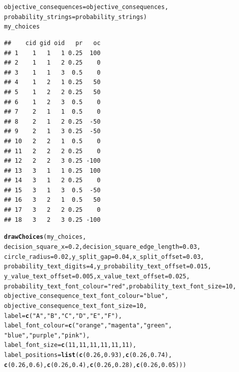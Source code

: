 \documentclass{article}\usepackage[]{graphicx}\usepackage[]{color}
\makeatletter
\newcommand{\hlnum}[1]{\textcolor[rgb]{0.686,0.059,0.569}{#1}}%
\newcommand{\hlstr}[1]{\textcolor[rgb]{0.192,0.494,0.8}{#1}}%
\newcommand{\hlstd}[1]{\textcolor[rgb]{0.345,0.345,0.345}{#1}}%
\newcommand{\hlkwc}[1]{\textcolor[rgb]{0.333,0.667,0.333}{#1}}%
\newcommand{\hlkwd}[1]{\textcolor[rgb]{0.737,0.353,0.396}{\textbf{#1}}}%
\newenvironment{kframe}{%
 \def\at@end@of@kframe{}%
 \ifinner\ifhmode%
  \def\at@end@of@kframe{\end{minipage}}%
  \begin{minipage}{\columnwidth}%
 \fi\fi%
 \def\FrameCommand##1{\hskip\@totalleftmargin \hskip-\fboxsep
 \colorbox{shadecolor}{##1}\hskip-\fboxsep
     \hskip-\linewidth \hskip-\@totalleftmargin \hskip\columnwidth}%
 \MakeFramed {\advance\hsize-\width
   \@totalleftmargin\z@ \linewidth\hsize
   \@setminipage}}%
 {\par\unskip\endMakeFramed%
 \at@end@of@kframe}
\newenvironment{knitrout}{}{} %
\makeatother
\begin{document}
\begin{knitrout}
\begin{kframe}
\begin{alltt}
        \hlkwc{objective_consequences}\hlstd{=objective_consequences,}
        \hlkwc{probability_strings}\hlstd{=probability_strings)}
\hlstd{my_choices}
\end{alltt}
\begin{verbatim}
##    cid gid oid   pr   oc
## 1    1   1   1 0.25  100
## 2    1   1   2 0.25    0
## 3    1   1   3  0.5    0
## 4    1   2   1 0.25   50
## 5    1   2   2 0.25   50
## 6    1   2   3  0.5    0
## 7    2   1   1  0.5    0
## 8    2   1   2 0.25  -50
## 9    2   1   3 0.25  -50
## 10   2   2   1  0.5    0
## 11   2   2   2 0.25    0
## 12   2   2   3 0.25 -100
## 13   3   1   1 0.25  100
## 14   3   1   2 0.25    0
## 15   3   1   3  0.5  -50
## 16   3   2   1  0.5   50
## 17   3   2   2 0.25    0
## 18   3   2   3 0.25 -100
\end{verbatim}
\begin{alltt}
\hlkwd{drawChoices}\hlstd{(my_choices,}
        \hlkwc{decision_square_x}\hlstd{=}\hlnum{0.2}\hlstd{,} \hlkwc{decision_square_edge_length}\hlstd{=}\hlnum{0.03}\hlstd{,}
        \hlkwc{circle_radius}\hlstd{=}\hlnum{0.02}\hlstd{,} \hlkwc{y_split_gap}\hlstd{=}\hlnum{0.04}\hlstd{,} \hlkwc{x_split_offset}\hlstd{=}\hlnum{0.03}\hlstd{,}
        \hlkwc{probability_text_digits}\hlstd{=}\hlnum{4}\hlstd{,} \hlkwc{y_probability_text_offset}\hlstd{=}\hlnum{0.015}\hlstd{,}
        \hlkwc{y_value_text_offset}\hlstd{=}\hlnum{0.005}\hlstd{,} \hlkwc{x_value_text_offset}\hlstd{=}\hlnum{0.025}\hlstd{,}
        \hlkwc{probability_text_font_colour}\hlstd{=}\hlstr{"red"}\hlstd{,} \hlkwc{probability_text_font_size}\hlstd{=}\hlnum{10}\hlstd{,}
        \hlkwc{objective_consequence_text_font_colour}\hlstd{=}\hlstr{"blue"}\hlstd{,}
        \hlkwc{objective_consequence_text_font_size}\hlstd{=}\hlnum{10}\hlstd{,}
        \hlkwc{label}\hlstd{=}\hlkwd{c}\hlstd{(}\hlstr{"A"}\hlstd{,}\hlstr{"B"}\hlstd{,}\hlstr{"C"}\hlstd{,} \hlstr{"D"}\hlstd{,}\hlstr{"E"}\hlstd{,}\hlstr{"F"}\hlstd{),}
        \hlkwc{label_font_colour}\hlstd{=}\hlkwd{c}\hlstd{(}\hlstr{"orange"}\hlstd{,}\hlstr{"magenta"}\hlstd{,}\hlstr{"green"}\hlstd{,}
                \hlstr{"blue"}\hlstd{,}\hlstr{"purple"}\hlstd{,}\hlstr{"pink"}\hlstd{),}
        \hlkwc{label_font_size}\hlstd{=}\hlkwd{c}\hlstd{(}\hlnum{11}\hlstd{,}\hlnum{11}\hlstd{,}\hlnum{11}\hlstd{,}\hlnum{11}\hlstd{,}\hlnum{11}\hlstd{,}\hlnum{11}\hlstd{),}
        \hlkwc{label_positions}\hlstd{=}\hlkwd{list}\hlstd{(}\hlkwd{c}\hlstd{(}\hlnum{0.26}\hlstd{,}\hlnum{0.93}\hlstd{),}\hlkwd{c}\hlstd{(}\hlnum{0.26}\hlstd{,}\hlnum{0.74}\hlstd{),}
                \hlkwd{c}\hlstd{(}\hlnum{0.26}\hlstd{,}\hlnum{0.6}\hlstd{),}\hlkwd{c}\hlstd{(}\hlnum{0.26}\hlstd{,}\hlnum{0.4}\hlstd{),}\hlkwd{c}\hlstd{(}\hlnum{0.26}\hlstd{,}\hlnum{0.28}\hlstd{),}\hlkwd{c}\hlstd{(}\hlnum{0.26}\hlstd{,}\hlnum{0.05}\hlstd{)))}
\end{alltt}
\end{kframe}


\end{knitrout}
\end{document}
